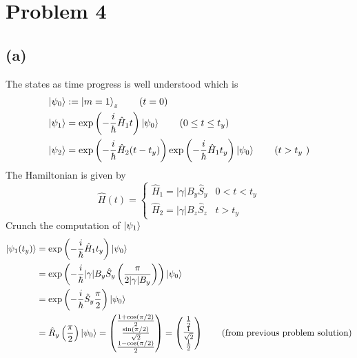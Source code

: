 \documentclass[letter, 10pts]{article}
\newcommand{\hb}{\hbar}
\begin{document}
\section*{Problem 4} 


\subsection*{(a)} 
The states as time progress is well understood which is 
\begin{align*}
	\ket{\psi_0} &:= \ket{m = 1}_z 
	\tag{$ t = 0 $} 
	\\
	\ket{\psi_1} &= \exp \left( - \frac{i}{\hb} \hat{H}_1 t\right) \ket{\psi_0} 
	\tag{$ 0 \le  t \le t_y $} 
	\\ 
	\ket{\psi_2} &= \exp 
	\left(- \frac{i}{\hb} \hat{H}_2 (t- t_y) \right)
	\exp \left( - \frac{i}{\hb} \hat{H}_1 t_y\right) \ket{\psi_0} 
	\tag{$t > t_y$ } 
	\\
\end{align*} 
The Hamiltonian is given by 
\begin{equation*}
\hat{H}(t) = 
\begin{cases}
	\hat{H}_1 = |\gamma| B_y \hat{S}_y & 0 < t < t_y \\ 
	\hat{H}_2 = |\gamma| B_z \hat{S}_z &t > t_y 
\end{cases}
\end{equation*} 
Crunch the computation of $\ket{\psi_1}$
\begin{align*}
	\ket{\psi_1(t_y)} &= 
	\exp \left( - \frac{i}{\hb} \hat{H}_1 t_y\right) \ket{\psi_0} 
	\\ 
	&= 
\exp 
\left(
- \frac{i}{\hb} | \gamma| B_y \hat{S}_y 
\left(
\frac{\pi }{2 | \gamma | B_y }
\right)
\right) 
\ket{\psi_0}
	\\ 
&= 
\exp
\left(
- \frac{i}{\hb} \hat{S}_y \frac{\pi}{2}\right) 
\ket{\psi_0}
\\
&= 
\hat R_y \left(\frac{\pi}{2} \right) \ket{\psi_0}
= 
\begin{pmatrix} 
\frac{1 + \cos (\pi / 2 ) }{2} \\ 
\frac{\sin ( \pi / 2)}{\sqrt{2} } \\ 
\frac{1 - \cos ( \pi / 2) }{2 }
\end{pmatrix} 
= \begin{pmatrix} \frac{1}{2} \\ \frac{1}{\sqrt{2} } \\ \frac{1}{2} \end{pmatrix}  
\tag{from previous problem solution} \end{align*}
\end{document}
